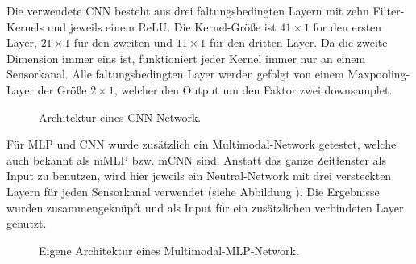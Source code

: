Die verwendete CNN besteht aus drei faltungsbedingten Layern mit zehn Filter-Kernels und jeweils einem ReLU.
Die Kernel-Größe ist $41 \times 1$ for den ersten Layer, $21 \times 1$ für den zweiten und $11 \times 1$ für den dritten Layer.
Da die zweite Dimension immer eins ist, funktioniert jeder Kernel immer nur an einem Sensorkanal.
Alle faltungsbedingten Layer werden gefolgt von einem Maxpooling-Layer der Größe $2 \times 1$, welcher den Output um den Faktor zwei downsamplet. \\


\begin{figure}[H]
\caption{Architektur eines CNN Network. }
\label{fig:cnn} \end{figure} \vspace{0.5cm}



Für MLP und CNN wurde zusätzlich ein Multimodal-Network getestet, welche auch bekannt als mMLP bzw. mCNN sind.
Anstatt das ganze Zeitfenster als Input zu benutzen, wird hier jeweils ein Neutral-Network mit drei versteckten Layern für jeden Sensorkanal verwendet (siehe Abbildung \cite{fig:multimodal_dnn}).
Die Ergebnisse wurden zusammengeknüpft und als Input für ein zusätzlichen verbindeten Layer genutzt. \\


\begin{figure}[H]
\caption{Eigene Architektur eines Multimodal-MLP-Network. }
\label{fig:multimodal_dnn} \end{figure} \vspace{0.5cm}


